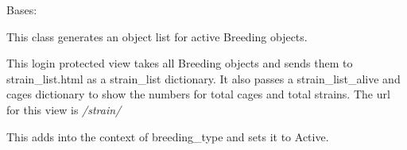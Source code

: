 \documentclass[letterpaper,10pt,english]{sphinxmanual}
\begin{document}
\begin{fulllineitems}
\label{api:mousedb.animal.views.BreedingList}
Bases: {\hyperref[api:mousedb.views.ProtectedListView]{}}

This class generates an object list for active Breeding objects.

This login protected view takes all Breeding objects and sends them to strain\_list.html as a strain\_list dictionary.  It also passes a strain\_list\_alive and cages dictionary to show the numbers for total cages and total strains.
The url for this view is \emph{/strain/}

\begin{fulllineitems}
\label{api:mousedb.animal.views.BreedingList.context_object_name}
\end{fulllineitems}


\begin{fulllineitems}
\label{api:mousedb.animal.views.BreedingList.get_context_data}
This adds into the context of breeding\_type and sets it to Active.

\end{fulllineitems}


\begin{fulllineitems}
\label{api:mousedb.animal.views.BreedingList.queryset}
\end{fulllineitems}


\begin{fulllineitems}
\label{api:mousedb.animal.views.BreedingList.template_name}
\end{fulllineitems}


\end{fulllineitems}

\end{document}
